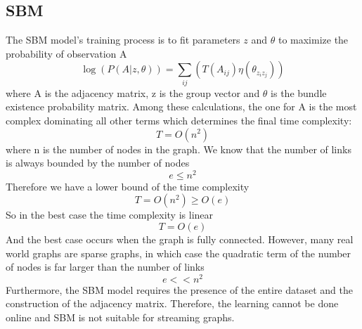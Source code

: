 \documentclass[12pt]{WSUThesis}
\theoremstyle{definition}
\begin{document}
\subsection{SBM}
The SBM model's training process is to fit parameters $ z $ and $ \theta $ to maximize the probability of observation A
\[\log(P(A|z, \theta))= \sum_{ij} (T(A_{ij}) \eta(\theta_{z_i z_j})
)\]
where A is the adjacency matrix, z is the group vector and $ \theta $ is the bundle existence probability matrix.
Among these calculations, the one for A is the most complex dominating all other terms which determines the final time complexity:
\[T = O(n^2)\]
where n is the number of nodes in the graph.
We know that the number of links is always bounded by the number of nodes
\[e \leq n^2\]
Therefore we have a lower bound of the time complexity
\[T = O(n^2) \geq O(e) \]
So in the best case the time complexity is linear
\[ T = O(e) \]
And the best case occurs when the graph is fully connected.
However, many real world graphs are sparse graphs, in which case the quadratic term of the number of nodes is far larger than the number of links
\[e << n^2\]
Furthermore, the SBM model requires the presence of the entire dataset and the construction of the adjacency matrix.
Therefore, the learning cannot be done online and SBM is not suitable for streaming graphs.
\end{document}
